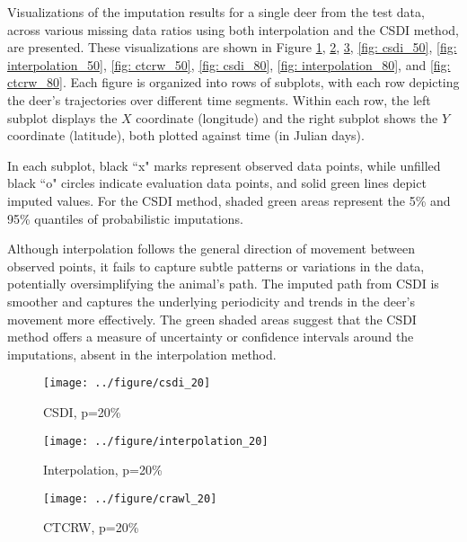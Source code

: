 \documentclass[11pt]{article}
\begin{document}
Visualizations of the imputation results for a single deer from the test data, across various missing data ratios using both interpolation and the CSDI method, are presented. These visualizations are shown in Figure \ref{fig: csdi_20}, \ref{fig: interpolation_20}, \ref{fig: ctcrw_20}, \ref{fig: csdi_50}, \ref{fig: interpolation_50}, \ref{fig: ctcrw_50}, \ref{fig: csdi_80}, \ref{fig: interpolation_80}, and \ref{fig: ctcrw_80}. Each figure is organized into rows of subplots, with each row depicting the deer's trajectories over different time segments. Within each row, the left subplot displays the $X$ coordinate (longitude) and the right subplot shows the $Y$ coordinate (latitude), both plotted against time (in Julian days).

In each subplot, black ``x" marks represent observed data points, while unfilled black ``o" circles indicate evaluation data points, and solid green lines depict imputed values. For the CSDI method, shaded green areas represent the 5\% and 95\% quantiles of probabilistic imputations.

Although interpolation follows the general direction of movement between observed points, it fails to capture subtle patterns or variations in the data, potentially oversimplifying the animal's path. The imputed path from CSDI is smoother and captures the underlying periodicity and trends in the deer's movement more effectively. The green shaded areas suggest that the CSDI method offers a measure of uncertainty or confidence intervals around the imputations, absent in the interpolation method.


\begin{figure}[h]
  \centering
  \texttt{[image: ../figure/csdi\_20]} %
  \caption{CSDI, p=20\%}
  \label{fig: csdi_20} %
\end{figure}

\begin{figure}[h]
  \centering
  \texttt{[image: ../figure/interpolation\_20]} %
  \caption{Interpolation, p=20\%}
  \label{fig: interpolation_20} %
\end{figure}

\begin{figure}[h]
  \centering
  \texttt{[image: ../figure/crawl\_20]} %
  \caption{CTCRW, p=20\%}
  \label{fig: ctcrw_20} %
\end{figure}
\end{document}
